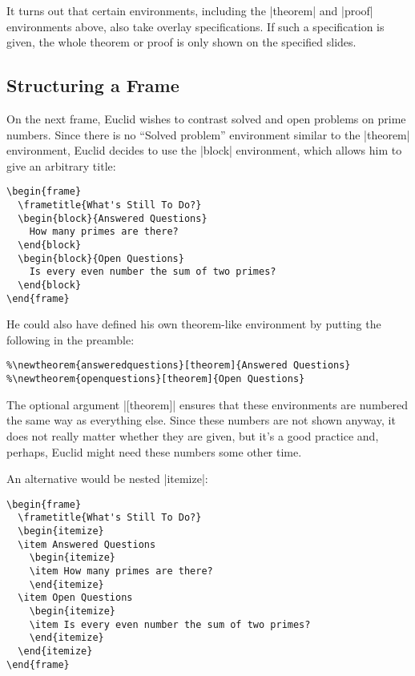 It turns out that certain environments, including the |theorem| and |proof| environments above, also take overlay specifications. If such a specification is given, the whole theorem or proof is only shown on the specified slides.


\subsection{Structuring a Frame}

On the next frame, Euclid wishes to contrast solved and open problems on prime numbers. Since there is no ``Solved problem'' environment similar to the |theorem| environment, Euclid decides to use the |block| environment, which allows him to give an arbitrary title:
\begin{verbatim}
\begin{frame}
  \frametitle{What's Still To Do?}
  \begin{block}{Answered Questions}
    How many primes are there?
  \end{block}
  \begin{block}{Open Questions}
    Is every even number the sum of two primes?
  \end{block}
\end{frame}
\end{verbatim}

He could also have defined his own theorem-like environment by putting the following in the preamble:
\begin{verbatim}
%\newtheorem{answeredquestions}[theorem]{Answered Questions}
%\newtheorem{openquestions}[theorem]{Open Questions}
\end{verbatim}
The optional argument |[theorem]| ensures that these environments are numbered the same way as everything else. Since these numbers are not shown anyway, it does not really matter whether they are given, but it's a good practice and, perhaps, Euclid might need these numbers some other time.

An alternative would be nested |itemize|:
\begin{verbatim}
\begin{frame}
  \frametitle{What's Still To Do?}
  \begin{itemize}
  \item Answered Questions
    \begin{itemize}
    \item How many primes are there?
    \end{itemize}
  \item Open Questions
    \begin{itemize}
    \item Is every even number the sum of two primes?
    \end{itemize}
  \end{itemize}
\end{frame}
\end{verbatim}

